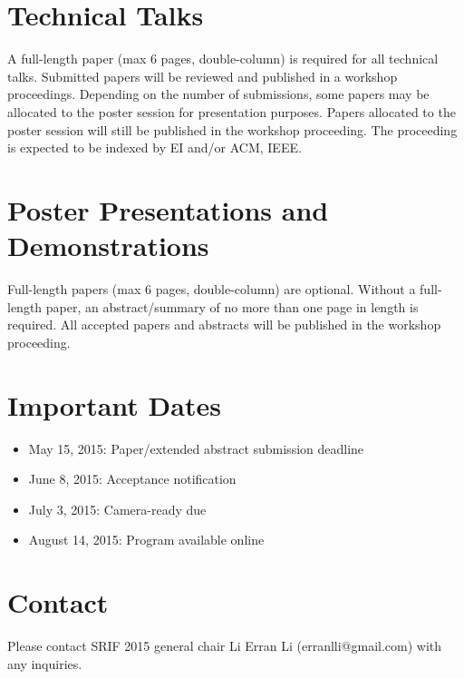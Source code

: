 \documentclass[11pt]{article}
\begin{document}
\section{Technical Talks}

A full-length paper (max 6 pages, double-column) is required for all
technical talks. Submitted papers will be reviewed and published in a
workshop proceedings. Depending on the number of submissions, some
papers may be allocated to the poster session for presentation
purposes. Papers allocated to the poster session will still be
published in the workshop proceeding. The proceeding is expected to be
indexed by EI and/or ACM, IEEE.


\section{Poster Presentations and Demonstrations}

Full-length papers (max 6 pages, double-column) are optional. Without
a full-length paper, an abstract/summary of no more than one page in
length is required. All accepted papers and abstracts will be
published in the workshop proceeding.



\section{Important Dates}

\begin{itemize}
\item May 15, 2015: Paper/extended abstract submission deadline
\item June 8, 2015: Acceptance notification
\item July 3, 2015: Camera-ready due
\item August 14, 2015: Program available online
\end{itemize}



\section{Contact}

Please contact SRIF 2015 general chair Li Erran Li
(erranlli@gmail.com) with any inquiries.
\end{document}
